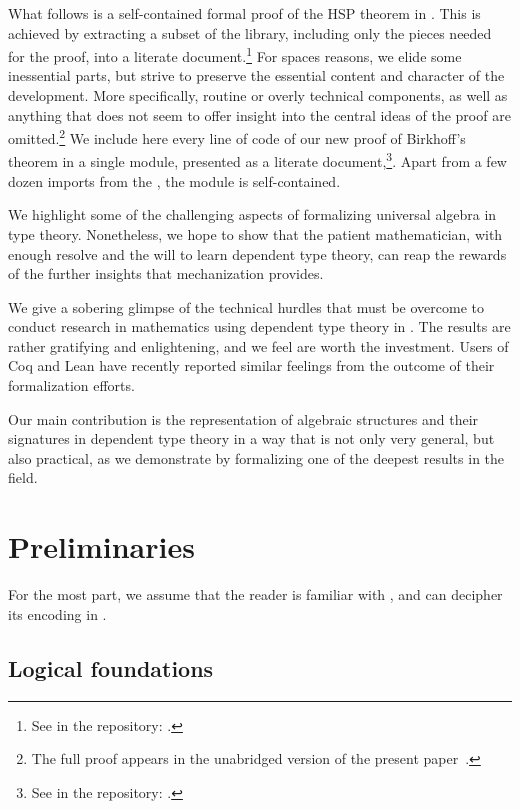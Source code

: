 What follows is a self-contained formal proof of the HSP theorem in \agda.  This is achieved by
extracting a subset of the \agdaalgebras library, including only the
pieces needed for the proof, into a literate \agda document.\footnote{See
\HSPlagda in the \agdaalgebras repository: \agdaalgebrasrepo .}
\ifshort
For spaces reasons, we elide some inessential parts,
but strive to preserve the essential content and character of the development.
More specifically, routine or overly technical components, as well as anything that does not
seem to offer insight into the central ideas of the proof are omitted.\footnote{The full proof
appears in the unabridged version of the present paper~\cite{DeMeo:2021}.}
\else
We include here every line of code of our new proof of Birkhoff's theorem
in a single \agda module, presented as a literate \agda document,\footnote{See
\HSPlagda in the \agdaalgebras repository: \agdaalgebrasrepo .}.  Apart from a few dozen
imports from the \agdastdlib, the module is self-contained.
\fi

We highlight some of the challenging aspects of formalizing universal algebra in type theory.
Nonetheless, we hope to show that the patient mathematician, with enough resolve and the will to learn
dependent type theory, can reap the rewards of the further insights that mechanization provides.

\ifshort\else
We give a sobering glimpse of the technical hurdles that must be overcome
to conduct research in mathematics using dependent type theory in \agda.
The results are rather gratifying and enlightening, and we feel are worth
the investment. Users of Coq and Lean have recently reported similar feelings
from the outcome of their formalization efforts.
\fi

Our main contribution is the representation of algebraic structures and their signatures
in dependent type theory in a way that is not only very general, but also practical, as we
demonstrate by formalizing one of the deepest results in the field.

\section{Preliminaries}

For the most part, we assume that the reader is familiar with \mltt, and can decipher its encoding in \agda.

\subsection{Logical foundations}

